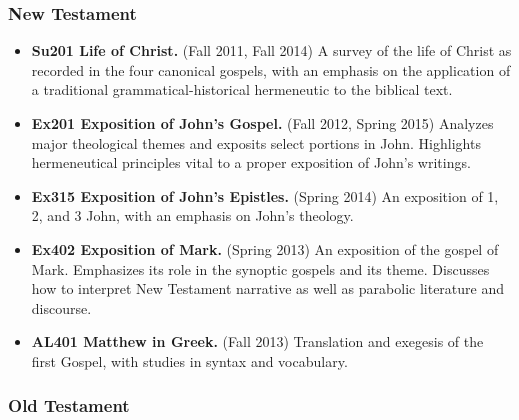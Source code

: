 \newpage




{\subsubsection{New Testament}\label{new-testament}

\begin{itemize}
\itemsep1pt\parskip0pt
\item
  \textbf{Su201 Life of Christ.} (Fall 2011, Fall 2014) A survey of the life of Christ as recorded in the four canonical gospels, with an emphasis on the application of a traditional grammatical-historical hermeneutic to the biblical text.
\item
  \textbf{Ex201 Exposition of John's Gospel.} (Fall 2012, Spring 2015) Analyzes major theological themes and exposits select portions in John. Highlights hermeneutical principles vital to a proper exposition of John's writings.
\item
  \textbf{Ex315 Exposition of John's Epistles.} (Spring 2014) An exposition of 1, 2, and 3 John, with an emphasis on John's theology.
\item
  \textbf{Ex402 Exposition of Mark.} (Spring 2013) An exposition of the gospel of Mark. Emphasizes its role in the synoptic gospels and its theme. Discusses how to interpret New Testament narrative as well as parabolic literature and discourse.
\item
  \textbf{AL401 Matthew in Greek.} (Fall 2013) Translation and exegesis of the first Gospel, with studies in syntax and vocabulary.
\end{itemize}

\subsubsection{Old Testament}\label{old-testament}

}
